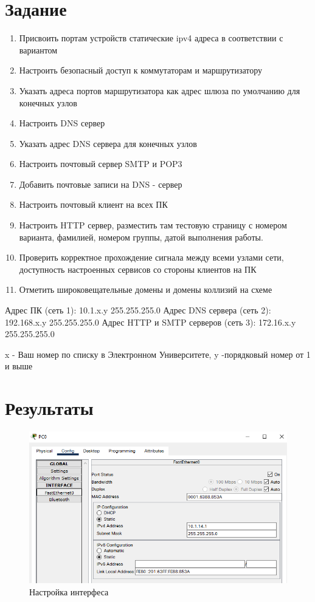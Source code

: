 \documentclass[12pt, a4paper]{extarticle}
\begin{document}


\section*{Задание}
\begin{enumerate}
\item Присвоить портам устройств статические ipv4 адреса в соответствии с вариантом
\item Настроить безопасный доступ к коммутаторам и маршрутизатору
\item Указать адреса портов маршрутизатора как адрес шлюза по умолчанию для конечных узлов
\item Настроить DNS сервер
\item Указать адрес DNS сервера для конечных узлов
\item Настроить почтовый сервер SMTP и POP3
\item Добавить почтовые записи на DNS - сервер 
\item Настроить почтовый клиент на всех ПК
\item Настроить HTTP сервер, разместить там тестовую страницу с номером варианта, фамилией, номером группы, датой выполнения работы.
\item Проверить корректное прохождение сигнала между всеми узлами сети, доступность   
настроенных сервисов со стороны клиентов на ПК 
\item Отметить широковещательные домены и домены коллизий на схеме
 \end{enumerate}
Адрес ПК (сеть 1): 10.1.x.y 255.255.255.0 
Адрес DNS сервера (сеть 2): 192.168.x.y 255.255.255.0
Адрес HTTP и SMTP серверов (сеть 3): 172.16.x.y 255.255.255.0

x - Ваш номер по списку в Электронном Университете, y -порядковый номер от 1 и выше


\newpage
\section{Результаты}
\begin{figure}[H]
	\centering
	\includegraphics[scale=0.7]{images/pc1.png}
	\caption{Настройка интерфеса}
\end{figure}
\end{document}

